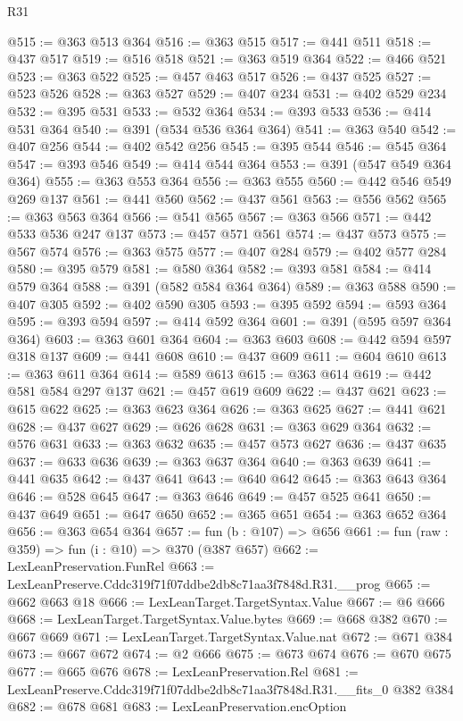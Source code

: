 \begin{lexlean}{R31}
\begin{coremodule}
@515 := @363 @513 @364
@516 := @363 @515
@517 := @441 @511
@518 := @437 @517
@519 := @516 @518
@521 := @363 @519 @364
@522 := @466 @521
@523 := @363 @522
@525 := @457 @463 @517
@526 := @437 @525
@527 := @523 @526
@528 := @363 @527
@529 := @407 @234
@531 := @402 @529 @234
@532 := @395 @531
@533 := @532 @364
@534 := @393 @533
@536 := @414 @531 @364
@540 := @391 (@534 @536 @364 @364)
@541 := @363 @540
@542 := @407 @256
@544 := @402 @542 @256
@545 := @395 @544
@546 := @545 @364
@547 := @393 @546
@549 := @414 @544 @364
@553 := @391 (@547 @549 @364 @364)
@555 := @363 @553 @364
@556 := @363 @555
@560 := @442 @546 @549 @269 @137
@561 := @441 @560
@562 := @437 @561
@563 := @556 @562
@565 := @363 @563 @364
@566 := @541 @565
@567 := @363 @566
@571 := @442 @533 @536 @247 @137
@573 := @457 @571 @561
@574 := @437 @573
@575 := @567 @574
@576 := @363 @575
@577 := @407 @284
@579 := @402 @577 @284
@580 := @395 @579
@581 := @580 @364
@582 := @393 @581
@584 := @414 @579 @364
@588 := @391 (@582 @584 @364 @364)
@589 := @363 @588
@590 := @407 @305
@592 := @402 @590 @305
@593 := @395 @592
@594 := @593 @364
@595 := @393 @594
@597 := @414 @592 @364
@601 := @391 (@595 @597 @364 @364)
@603 := @363 @601 @364
@604 := @363 @603
@608 := @442 @594 @597 @318 @137
@609 := @441 @608
@610 := @437 @609
@611 := @604 @610
@613 := @363 @611 @364
@614 := @589 @613
@615 := @363 @614
@619 := @442 @581 @584 @297 @137
@621 := @457 @619 @609
@622 := @437 @621
@623 := @615 @622
@625 := @363 @623 @364
@626 := @363 @625
@627 := @441 @621
@628 := @437 @627
@629 := @626 @628
@631 := @363 @629 @364
@632 := @576 @631
@633 := @363 @632
@635 := @457 @573 @627
@636 := @437 @635
@637 := @633 @636
@639 := @363 @637 @364
@640 := @363 @639
@641 := @441 @635
@642 := @437 @641
@643 := @640 @642
@645 := @363 @643 @364
@646 := @528 @645
@647 := @363 @646
@649 := @457 @525 @641
@650 := @437 @649
@651 := @647 @650
@652 := @365 @651
@654 := @363 @652 @364
@656 := @363 @654 @364
@657 := fun (b : @107) => @656
@661 := fun (raw : @359) => fun (i : @10) => @370 (@387 @657)
@662 := LexLeanPreservation.FunRel
@663 := LexLeanPreserve.Cddc319f71f07ddbe2db8c71aa3f7848d.R31.__prog
@665 := @662 @663 @18
@666 := LexLeanTarget.TargetSyntax.Value
@667 := @6 @666
@668 := LexLeanTarget.TargetSyntax.Value.bytes
@669 := @668 @382
@670 := @667 @669
@671 := LexLeanTarget.TargetSyntax.Value.nat
@672 := @671 @384
@673 := @667 @672
@674 := @2 @666
@675 := @673 @674
@676 := @670 @675
@677 := @665 @676
@678 := LexLeanPreservation.Rel
@681 := LexLeanPreserve.Cddc319f71f07ddbe2db8c71aa3f7848d.R31.__fits_0 @382 @384
@682 := @678 @681
@683 := LexLeanPreservation.encOption

\end{coremodule}
\end{lexlean}
